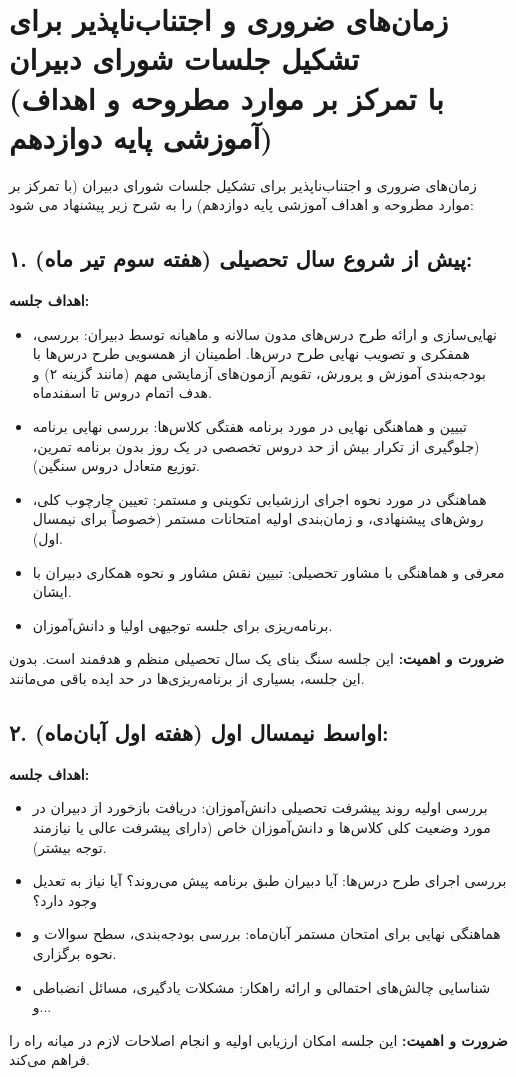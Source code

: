 \documentclass[a4paper]{article}
\begin{document}
\section*{زمان‌های ضروری و اجتناب‌ناپذیر برای تشکیل جلسات شورای دبیران \\
(با تمرکز بر موارد مطروحه و اهداف آموزشی پایه دوازدهم)}
\medskip
زمان‌های ضروری و اجتناب‌ناپذیر برای تشکیل جلسات شورای دبیران (با تمرکز بر موارد مطروحه و اهداف آموزشی پایه دوازدهم) را به شرح زیر پیشنهاد می شود:
\bigskip
\subsection*{۱. پیش از شروع سال تحصیلی (هفته سوم تیر ماه):}
\textbf{اهداف جلسه:}
\begin{itemize}
    \item نهایی‌سازی و ارائه طرح درس‌های مدون سالانه و ماهیانه توسط دبیران: بررسی، همفکری و تصویب نهایی طرح درس‌ها. اطمینان از همسویی طرح درس‌ها با بودجه‌بندی آموزش و پرورش، تقویم آزمون‌های آزمایشی مهم (مانند گزینه ۲) و هدف اتمام دروس تا اسفندماه.
    \item تبیین و هماهنگی نهایی در مورد برنامه هفتگی کلاس‌ها: بررسی نهایی برنامه  (جلوگیری از تکرار بیش از حد دروس تخصصی در یک روز بدون برنامه تمرین، توزیع متعادل دروس سنگین).
    \item هماهنگی در مورد نحوه اجرای ارزشیابی تکوینی و مستمر: تعیین چارچوب کلی، روش‌های پیشنهادی، و زمان‌بندی اولیه امتحانات مستمر (خصوصاً برای نیمسال اول).
    \item معرفی و هماهنگی با مشاور تحصیلی: تبیین نقش مشاور و نحوه همکاری دبیران با ایشان.
    \item برنامه‌ریزی برای جلسه توجیهی اولیا و دانش‌آموزان.
\end{itemize}
\textbf{ضرورت و اهمیت:} این جلسه سنگ بنای یک سال تحصیلی منظم و هدفمند است. بدون این جلسه، بسیاری از برنامه‌ریزی‌ها در حد ایده باقی می‌مانند.
\medskip

\subsection*{۲. اواسط نیمسال اول (هفته اول آبان‌ماه):}
\textbf{اهداف جلسه:}
\begin{itemize}
    \item بررسی اولیه روند پیشرفت تحصیلی دانش‌آموزان: دریافت بازخورد از دبیران در مورد وضعیت کلی کلاس‌ها و دانش‌آموزان خاص (دارای پیشرفت عالی یا نیازمند توجه بیشتر).
    \item بررسی اجرای طرح درس‌ها: آیا دبیران طبق برنامه پیش می‌روند؟ آیا نیاز به تعدیل وجود دارد؟
    \item هماهنگی نهایی برای امتحان مستمر آبان‌ماه: بررسی بودجه‌بندی، سطح سوالات و نحوه برگزاری.
    \item شناسایی چالش‌های احتمالی و ارائه راهکار: مشکلات یادگیری، مسائل انضباطی و...
\end{itemize}
\textbf{ضرورت و اهمیت:} این جلسه امکان ارزیابی اولیه و انجام اصلاحات لازم در میانه راه را فراهم می‌کند.
\medskip
\end{document}
